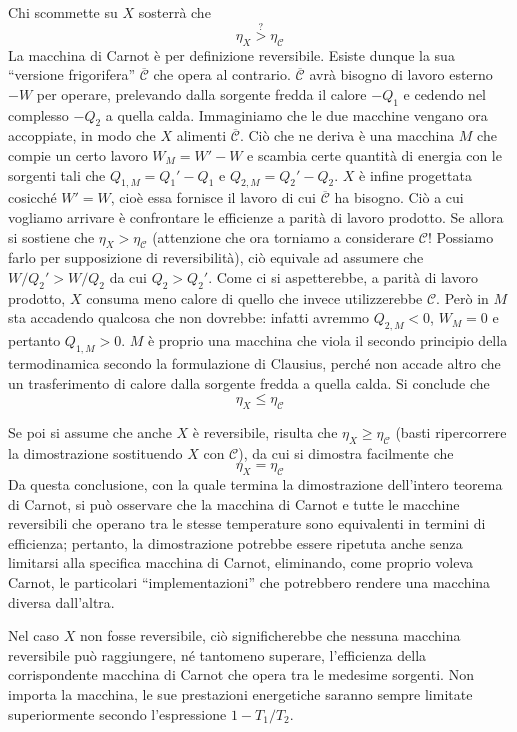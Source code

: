 Chi scommette su $X$ sosterrà che \[\eta_X \stackrel{?}{>} \eta_\mathcal{C} \]
La macchina di Carnot è per definizione reversibile. Esiste dunque
la sua ``versione frigorifera'' $\overline{\mathcal{C}}$ che opera al contrario.
$\overline{\mathcal{C}}$ avrà bisogno di lavoro esterno $-W$ per operare,
prelevando dalla sorgente fredda il calore $-Q_1$ e cedendo nel
complesso $-Q_2$ a quella calda. Immaginiamo che le due macchine
vengano ora accoppiate, in modo che $X$ alimenti $\overline{\mathcal{C}}$.
Ciò che ne deriva è una macchina $M$ che compie un certo lavoro
$W_M = W' - W$ e scambia certe quantità di energia con le sorgenti
tali che $Q_{1,M} = Q_1'-Q_1$ e $Q_{2,M} = Q_2' - Q_2$. $X$ è infine
progettata cosicché $W' = W$, cioè essa fornisce il lavoro di cui
$\overline{\mathcal{C}}$ ha bisogno. Ciò a cui vogliamo arrivare è
confrontare le efficienze a parità di lavoro prodotto.
Se allora si sostiene che $\eta_X > \eta_\mathcal{C}$ (attenzione che
ora torniamo a considerare $\mathcal{C}$! Possiamo farlo per supposizione
di reversibilità), ciò equivale
ad assumere che $W/Q_2' > W/Q_2$ da cui $Q_2 > Q_2'$. Come ci si
aspetterebbe, a parità di lavoro prodotto, $X$ consuma meno calore di
quello che invece utilizzerebbe $\mathcal{C}$.
Però in $M$ sta accadendo qualcosa che non dovrebbe: infatti
avremmo $Q_{2,M} < 0$, $W_M = 0$ e pertanto $Q_{1,M} > 0$. $M$ è proprio
una macchina che viola il secondo principio della
termodinamica secondo la formulazione di Clausius, perché non accade
altro che un trasferimento di calore dalla sorgente fredda a quella calda.
Si conclude che \[ \eta_X \leq \eta_\mathcal{C} \]

Se poi si assume che anche $X$ è reversibile, risulta che
$\eta_X \geq \eta_\mathcal{C}$ (basti ripercorrere la dimostrazione
sostituendo $X$ con $\mathcal{C}$), da cui si dimostra facilmente
che \[ \eta_X = \eta_\mathcal{C} \] Da questa conclusione, con
la quale termina la dimostrazione dell'intero teorema di Carnot,
si può osservare che la macchina di Carnot e tutte le macchine
reversibili che operano tra le stesse temperature sono equivalenti
in termini di efficienza; pertanto, la dimostrazione potrebbe essere
ripetuta anche senza limitarsi alla specifica macchina di Carnot,
eliminando, come proprio voleva Carnot, le particolari ``implementazioni''
che potrebbero rendere una macchina diversa dall'altra.

Nel caso $X$ non fosse reversibile, ciò significherebbe che
nessuna macchina reversibile può raggiungere, né tantomeno
superare, l'efficienza della corrispondente macchina di Carnot
che opera tra le medesime sorgenti. Non importa la macchina,
le sue prestazioni energetiche saranno sempre limitate superiormente
secondo l'espressione $1 - T_1/T_2$.

